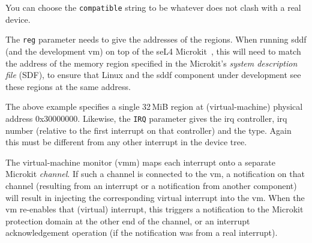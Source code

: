 \documentclass[a4paper,12pt]{report}
\newcommand{\Comment}[1]{\textbf{\textsl{#1}}}
\newcommand{\Comment}[1]{\relax}
\newcommand{\gernot}[1]{\Comment{#1 \colorbox{yellow}{[gernot]}}}
\newcommand{\peterc}[1]{\Comment{#1 \colorbox{yellow}{[peterc]}}}
\newcommand{\code}[1]{\texttt{#1}}
\begin{document}
You can choose the \code{compatible} string to be whatever does not
clash with a real device.

The \code{reg} parameter needs to give the addresses of the
regions. When running \gls{sddf} (and the development \gls{vm}) on top of the seL4
Microkit~\citep{microkit:url}, this will need to match the address of
the memory region specified in the Microkit's \emph{system description file}
(SDF), to ensure that
Linux and the \gls{sddf} component under development see these regions at
the same address.

The above example specifies a single
32\,MiB region at (virtual-machine) physical address 0x30000000.
Likewise, the \code{IRQ} parameter gives the \gls{irq} controller, \gls{irq}
number (relative to the first interrupt on that controller) and the
type.  Again this must be different from any other interrupt in the
device tree.

The virtual-machine monitor (\gls{vmm}) maps each interrupt onto a separate Microkit
\emph{channel}. If such a channel is connected to the \gls{vm}, a
notification on that channel (resulting from an interrupt or a
notification from another component) will result in injecting the
corresponding virtual interrupt into the \gls{vm}. When the \gls{vm} re-enables
that (virtual) interrupt, this triggers a notification to the Microkit
protection domain at the other end of the channel, or an interrupt
acknowledgement operation (if the notification was from a real
interrupt).
\end{document}
